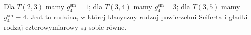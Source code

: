 \begin{przyklad}
Dla $T(2,3)$ mamy $g_4^{\mathrm{sm}}=1$;
dla $T(3,4)$ mamy $g_4^{\mathrm{sm}}=3$;
dla $T(3,5)$ mamy $g_4^{\mathrm{sm}}=4$.
Jest to rodzina, w której klasyczny rodzaj powierzchni
Seiferta i gładki rodzaj czterowymiarowy są sobie równe.
\end{przyklad}




